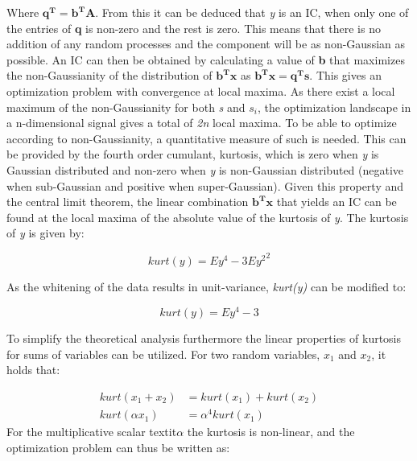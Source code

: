 Where $\mathbf{q^T} = \mathbf{b^T}\mathbf{A}$. From this it can be deduced that \textit{y} is an IC, when only one of the entries of \textbf{q} is non-zero and the rest is zero. This means that there is no addition of any random processes and the component will be as non-Gaussian as possible. An IC can then be obtained by calculating a value of \textbf{b} that maximizes the non-Gaussianity of the distribution of $\mathbf{b^T}\mathbf{x}$ as $\mathbf{b^T}\mathbf{x} = \mathbf{q^T}\mathbf{s}$. This gives an optimization problem with convergence at local maxima. As there exist a local maximum of the non-Gaussianity for both \textit{s} and ${s_i}$, the optimization landscape in a n-dimensional signal gives a total of \textit{2n} local maxima.
 To be able to optimize according to non-Gaussianity, a quantitative measure of such is needed. This can be provided by the fourth order cumulant, kurtosis, which is zero when \textit{y} is Gaussian distributed and non-zero when \textit{y} is non-Gaussian distributed (negative when sub-Gaussian and positive when super-Gaussian). Given this property and the central limit theorem, the linear combination $\mathbf{b^T}\mathbf{x}$ that yields an IC can be found at the local maxima of the absolute value of the kurtosis of \textit{y}. The kurtosis of \textit{y} is given by:
 		
\begin{equation}
kurt(y) = E{y^4} - 3E{y^2}^2
\end{equation}
 		
As the whitening of the data results in unit-variance, \textit{kurt(y)} can be modified to:
		
\begin{equation}
kurt(y) = E{y^4} - 3
\end{equation}
 		
To simplify the theoretical analysis furthermore the linear properties of kurtosis for sums of variables can be utilized. For two random variables, \textit{$x_1$} and \textit{$x_2$}, it holds that:

\begin{equation}
\begin{split}
kurt(x_1 + x_2) &= kurt(x_1) + kurt(x_2) \\
kurt(\alpha x_1) &= \alpha^4 kurt(x_1)
\end{split}
\end{equation} 			
For the multiplicative scalar textit{$\alpha$} the kurtosis is non-linear, and the optimization problem can thus be written as:
 			

